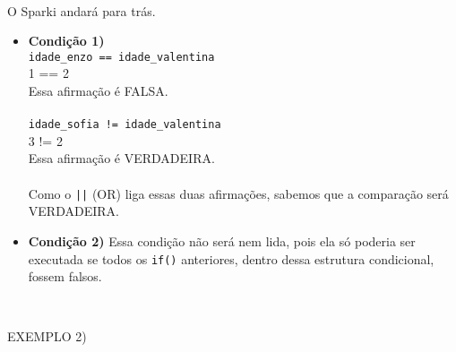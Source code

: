 \documentclass[conference]{IEEEtran}
\begin{document}
\\
\par
O Sparki andará para trás.
\begin{itemize}
    \item \textbf{Condição 1)} \\
    \texttt{idade\_enzo == idade\_valentina} \\
    1 == 2 \\
    Essa afirmação é FALSA.\\
    \\
    \texttt{idade\_sofia != idade\_valentina} \\
    3 != 2 \\
    Essa afirmação é VERDADEIRA.\\
    \\
    Como o \texttt{||} (OR) liga essas duas afirmações, sabemos que a comparação será VERDADEIRA.
    
    \item \textbf{Condição 2)} Essa condição não será nem lida, pois ela só poderia ser executada se todos os \texttt{if()} anteriores, dentro dessa estrutura condicional, fossem falsos.
\end{itemize}
\\
\begin{center}
EXEMPLO 2)
\end{center}
\\
\\
\end{document}
